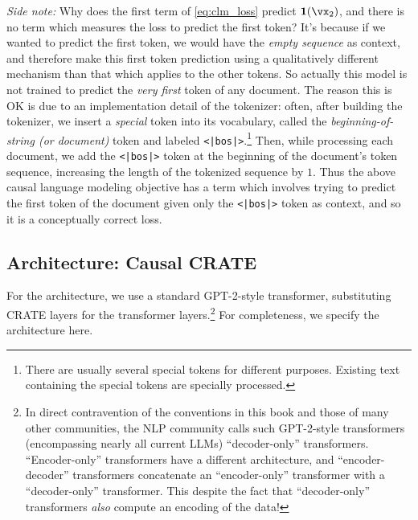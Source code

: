 \documentclass[../../book-main.tex]{subfiles}
\begin{document}
\textit{Side note:} Why does the first term of \eqref{eq:clm_loss} predict \(\vone(\vx_{2})\), and there is no term which measures the loss to predict the first token? It's because if we wanted to predict the first token, we would have the \textit{empty sequence} as context, and therefore make this first token prediction using a qualitatively different mechanism than that which applies to the other tokens. So actually this model is not trained to predict the \textit{very first} token of any document. The reason this is OK is due to an implementation detail of the tokenizer: often, after building the tokenizer, we insert a \textit{special} token into its vocabulary, called the \textit{beginning-of-string (or document)} token and labeled \texttt{<|bos|>}.\footnote{There are usually several special tokens for different purposes. Existing text containing the special tokens are specially processed.} Then, while processing each document, we add the \texttt{<|bos|>} token at the beginning of the document's token sequence, increasing the length of the tokenized sequence by \(1\). Thus the above causal language modeling objective has a term which involves trying to predict the first token of the document given only the \texttt{<|bos|>} token as context, and so it is a conceptually correct loss.

\subsection{Architecture: Causal CRATE}

For the architecture, we use a standard GPT-2-style transformer, substituting CRATE layers for the transformer layers.\footnote{In direct contravention of the conventions in this book and those of many other communities, the NLP community calls such GPT-2-style transformers (encompassing nearly all current LLMs) ``decoder-only'' transformers. ``Encoder-only'' transformers have a different architecture, and ``encoder-decoder'' transformers concatenate an ``encoder-only'' transformer with a ``decoder-only'' transformer. This despite the fact that ``decoder-only'' transformers \textit{also} compute an encoding of the data!} For completeness, we specify the architecture here.
\end{document}
